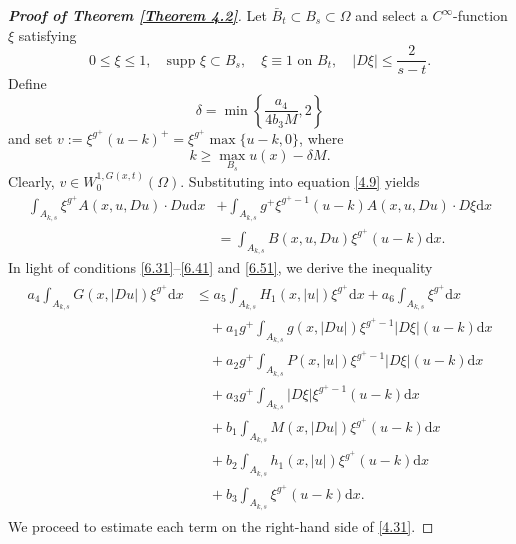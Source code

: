 \documentclass[10pt,reqno]{amsart}
\newcommand *\w{^\wedge}
\theoremstyle{definition}
\numberwithin{equation}{section}
\begin{document}
\begin{proof}[\textbf{Proof of Theorem \ref{Theorem 4.2}}]
Let \(\bar{B}_t \subset B_s \subset \Omega\) and select a \(C^\infty\)-function \(\xi\) satisfying
\begin{equation}\label{55eq}
0 \leq \xi \leq 1, \quad \text{supp } \xi \subset B_s, \quad \xi \equiv 1 \text{ on } B_t, \quad |D\xi| \leq \frac{2}{s - t}.
\end{equation}
Define
\begin{equation}\label{4.29}
\delta = \min \left\{ \frac{a_4}{4b_3M}, 2 \right\}
\end{equation}
and set \(v := \xi^{g^+} (u - k)^+ = \xi^{g^+} \max \{u - k, 0\}\), where
\begin{equation}\label{4.30}
k \geq \max_{B_s} u(x) - \delta M.
\end{equation}
Clearly, \(v \in W_0^{1,G(x,t)}(\Omega)\). Substituting into equation \eqref{4.9} yields
\begin{align}\label{eq55}
      \int_{A_{k,s}} \xi^{g^+} A(x, u, Du) \cdot Du  \mathrm{d}x &+ \int_{A_{k,s}} g^+\xi^{g^+-1} (u - k) A(x, u, Du) \cdot D\xi  \mathrm{d}x \\
      &= \int_{A_{k,s}} B(x, u, Du) \xi^{g^+} (u - k)  \mathrm{d}x.    
\end{align}
In light of conditions \eqref{6.31}--\eqref{6.41} and \eqref{6.51}, we derive the inequality
\begin{align}\label{4.31}
\begin{split}
a_4 \int_{A_{k,s}} G(x,|Du|) \xi^{g^+}  \mathrm{d}x &\leq a_5 \int_{A_{k,s}} H_1(x,|u|) \xi^{g^+}  \mathrm{d}x + a_6 \int_{A_{k,s}} \xi^{g^+}  \mathrm{d}x \\
&\quad + a_1 g^+ \int_{A_{k,s}} g(x,|Du|) \xi^{g^+-1} |D\xi|(u - k)  \mathrm{d}x \\
&\quad + a_2 g^+\int_{A_{k,s}} P(x,|u|) \xi^{g^+-1} |D\xi|(u - k)  \mathrm{d}x \\
&\quad + a_3g^+ \int_{A_{k,s}} |D\xi| \xi^{g^+-1}(u - k)  \mathrm{d}x \\
&\quad + b_1 \int_{A_{k,s}}M(x,|Du|) \xi^{g^+} (u - k)  \mathrm{d}x \\
&\quad + b_2 \int_{A_{k,s}}h_1(x,|u|) \xi^{g^+} (u - k)  \mathrm{d}x \\
&\quad + b_3 \int_{A_{k,s}} \xi^{g^+} (u - k)  \mathrm{d}x.
\end{split}
\end{align}
We proceed to estimate each term on the right-hand side of \eqref{4.31}.


\end{proof}
\end{document}
